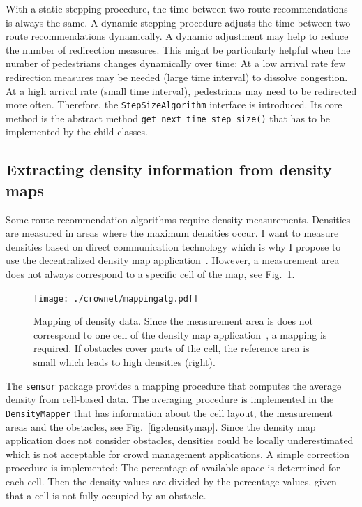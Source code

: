 With a static stepping procedure, the time between two route recommendations is always the same. A dynamic stepping procedure adjusts the time between two route recommendations dynamically. A dynamic adjustment may help to reduce the number of redirection measures. This might be particularly helpful when the number of pedestrians changes dynamically over time: At a low arrival rate few redirection measures may be needed (large time interval) to dissolve congestion. At a high arrival rate (small time interval), pedestrians may need to be redirected more often. Therefore, the \lstinline{StepSizeAlgorithm} interface is introduced. Its core method is the abstract method \lstinline{get_next_time_step_size()} that has to be implemented by the child classes. 

\subsection{Extracting density information from density maps}
\label{sec:mappingproc}

Some route recommendation algorithms require density measurements. Densities are measured in areas where the maximum densities occur. I want to measure densities based on direct communication technology which is why I propose to use the decentralized density map application~\cite{schuhbaeck-2023-com}. However, a measurement area does not always correspond to a specific cell of the map, see Fig.~\ref{fig:mappingproblem}. 


\begin{figure}[H]
\centering
\texttt{[image: ./crownet/mappingalg.pdf]} 
\caption[]{Mapping of density data. Since the measurement area is does not correspond to one cell of the density map application~\cite{schuhbaeck-2023-com}, a mapping is required. If obstacles cover parts of the cell, the reference area is small which leads to high densities (right). }
\label{fig:mappingproblem}
\end{figure}


The \lstinline{sensor} package provides a mapping procedure that computes the average density from cell-based data. The averaging procedure is implemented in the \lstinline{DensityMapper} that has information about the cell layout, the measurement areas and the obstacles, see Fig.~\ref{fig:densitymap}.  Since the density map application does not consider obstacles, densities could be locally underestimated which is not acceptable for crowd management applications. A simple correction procedure is implemented: The percentage of available space is determined for each cell. Then the density values are divided by the percentage values, given that a cell is not fully occupied by an obstacle.



